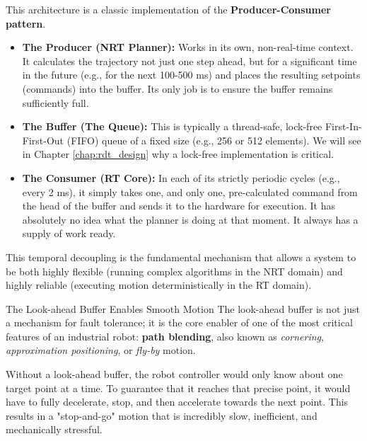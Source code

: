 This architecture is a classic implementation of the \textbf{Producer-Consumer pattern}.
\begin{itemize}
    \item \textbf{The Producer (NRT Planner):} Works in its own, non-real-time context. It calculates the trajectory not just one step ahead, but for a significant time in the future (e.g., for the next 100-500 ms) and places the resulting setpoints (commands) into the buffer. Its only job is to ensure the buffer remains sufficiently full.
    \item \textbf{The Buffer (The Queue):} This is typically a thread-safe, lock-free First-In-First-Out (FIFO) queue of a fixed size (e.g., 256 or 512 elements). We will see in Chapter \ref{chap:rdt_design} why a lock-free implementation is critical.
    \item \textbf{The Consumer (RT Core):} In each of its strictly periodic cycles (e.g., every 2 ms), it simply takes one, and only one, pre-calculated command from the head of the buffer and sends it to the hardware for execution. It has absolutely no idea what the planner is doing at that moment. It always has a supply of work ready.
\end{itemize}

This temporal decoupling is the fundamental mechanism that allows a system to be both highly flexible (running complex algorithms in the NRT domain) and highly reliable (executing motion deterministically in the RT domain).


\begin{tipbox}{The Look-ahead Buffer Enables Smooth Motion}
    The look-ahead buffer is not just a mechanism for fault tolerance; it is the core enabler of one of the most critical features of an industrial robot: \textbf{path blending}, also known as \textit{cornering}, \textit{approximation positioning}, or \textit{fly-by} motion.
\end{tipbox}

Without a look-ahead buffer, the robot controller would only know about one target point at a time. To guarantee that it reaches that precise point, it would have to fully decelerate, stop, and then accelerate towards the next point. This results in a "stop-and-go" motion that is incredibly slow, inefficient, and mechanically stressful.

